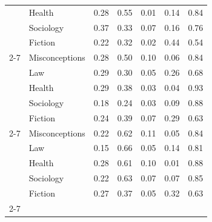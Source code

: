 \begin{table}[htbp]
\begin{tabular}{ll|cccc|c}
 & Health & 0.28 & 0.55 & 0.01 & 0.14 & 0.84 \\
 & Sociology & 0.37 & 0.33 & 0.07 & 0.16 & 0.76 \\
 & Fiction & 0.22 & 0.32 & 0.02 & 0.44 & 0.54 \\
\cline{2-7}
\multirow{5}{*}{\rotatebox{90}{Llama 4 Maverick}} & Misconceptions & 0.28 & 0.50 & 0.10 & 0.06 & 0.84 \\
 & Law & 0.29 & 0.30 & 0.05 & 0.26 & 0.68 \\
 & Health & 0.29 & 0.38 & 0.03 & 0.04 & 0.93 \\
 & Sociology & 0.18 & 0.24 & 0.03 & 0.09 & 0.88 \\
 & Fiction & 0.24 & 0.39 & 0.07 & 0.29 & 0.63 \\
\cline{2-7}
\multirow{5}{*}{\rotatebox{90}{Gemini 2.0 Flash}} & Misconceptions & 0.22 & 0.62 & 0.11 & 0.05 & 0.84 \\
 & Law & 0.15 & 0.66 & 0.05 & 0.14 & 0.81 \\
 & Health & 0.28 & 0.61 & 0.10 & 0.01 & 0.88 \\
 & Sociology & 0.22 & 0.63 & 0.07 & 0.07 & 0.85 \\
 & Fiction & 0.27 & 0.37 & 0.05 & 0.32 & 0.63 \\
\cline{2-7}
\bottomrule
\end{tabular}
\end{table}

